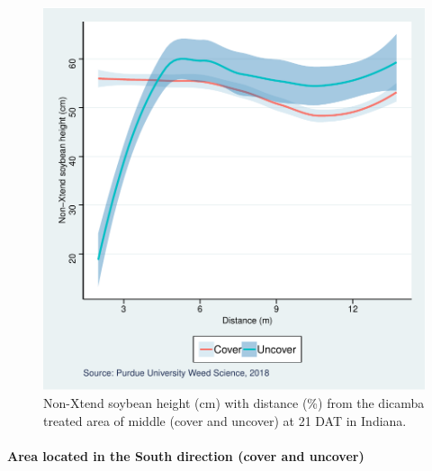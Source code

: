 \documentclass[]{article}
\let\oldparagraph\paragraph
\renewcommand{\paragraph}[1]{\oldparagraph{#1}\mbox{}}
\begin{document}
\begin{figure}
\centering
\includegraphics{Report_Dicamba_study_files/figure-latex/unnamed-chunk-37-1.pdf}
\caption{Non-Xtend soybean height (cm) with distance (\%) from the
dicamba treated area of middle (cover and uncover) at 21 DAT in
Indiana.}
\end{figure}

\newpage

\paragraph{\texorpdfstring{Area located in the \textbf{South} direction
(cover and
uncover)}{Area located in the South direction (cover and uncover)}}\label{area-located-in-the-south-direction-cover-and-uncover}
\end{document}
